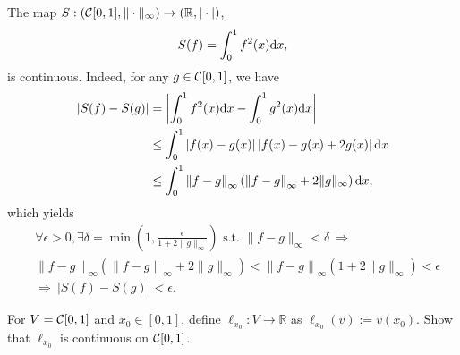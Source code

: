 \begin{exm}
  The map $S: ({\cal C}[0,1], \|\cdot\|_{\infty}) \rightarrow
  (\mathbb{R}, |\cdot|)$,  
  \begin{equation}
    \label{eq:contFunExmpInt}
    S(f) = \int_0^1 f^2(x) \mathrm{d} x, 
  \end{equation}
  is continuous.
  Indeed, for any $g\in {\cal C}[0,1]$, 
  we have
  \begin{align*}
    |S(f)-S(g)| &= 
    \left| \int_0^1 f^2(x) \mathrm{d} x - \int_0^1 g^2(x) \mathrm{d} x
                  \right|
    \\ &\le
         \int_0^1 \left|f(x)-g(x)\right|
                  \left|f(x)-g(x)+2g(x)\right|
         \mathrm{d} x 
    \\ &\le
         \int_0^1 \left\|f-g\right\|_{\infty}
         \left(\left\|f-g\right\|_{\infty}+2\|g\|_{\infty}\right)
         \mathrm{d} x, 
  \end{align*}
  which yields  
  \begin{align*}
    &\forall \epsilon>0,
    \exists \delta=\min\left(1,\frac{\epsilon}{1+2\|g\|_{\infty}}\right)
      \text{ s.t. }
    \|f-g\|_{\infty} < \delta\ \Rightarrow\
    \\
    & \left\|f-g\right\|_{\infty}
      \left(\left\|f-g\right\|_{\infty}+2\|g\|_{\infty}\right)
      <
      \left\|f-g\right\|_{\infty}
      \left(1+2\|g\|_{\infty}\right)
      < \epsilon
    \\
    & \Rightarrow\ |S(f)-S(g)| <\epsilon.
  \end{align*}
\end{exm}

\begin{exc}
  For $V={\cal C}[0,1]$ and $x_0\in [0,1]$,
  define $\ell_{x_0}: V\rightarrow \mathbb{R}$ as
  $\ell_{x_0}(v) := v(x_0)$.
  Show that $\ell_{x_0}$ is continuous on ${\cal C}[0,1]$.
\end{exc}

